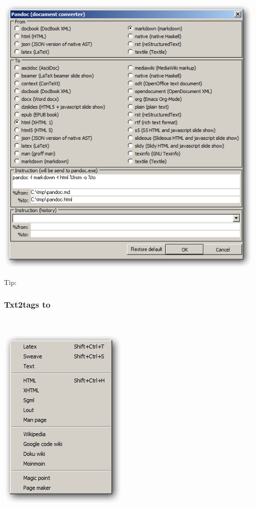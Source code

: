 \includegraphics[scale=.50]{./res/pandoc.png}

Tip: 


\hypertarget{menu_tools_processing_conversion_txt2tags}{}
\subsubsection{Txt2tags to}\\

\includegraphics[scale=0.50]{./res/menu_tools_processing_conversion_txt2tags.png}\\

